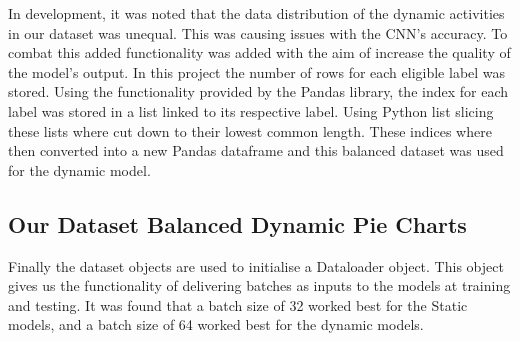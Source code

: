             In development, it was noted that the data distribution of the dynamic activities in our dataset was unequal.
            This was causing issues with the CNN's accuracy.
            To combat this added functionality was added with the aim of increase the quality of the model's output.
            In this project the number of rows for each eligible label was stored.
            Using the functionality provided by the Pandas library, the index for each label was stored in a list linked to its respective label.
            Using Python list slicing these lists where cut down to their lowest common length.
            These indices where then converted into a new Pandas dataframe and this balanced dataset was used for the dynamic model.

            \subsection{Our Dataset Balanced Dynamic Pie Charts}

            Finally the dataset objects are used to initialise a Dataloader object.
            This object gives us the functionality of delivering batches as inputs to the models at training and testing.
            It was found that a batch size of 32 worked best for the Static models, and a batch size of 64 worked best for the dynamic models.